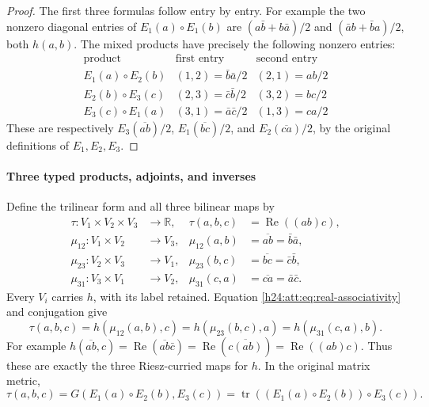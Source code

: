\begin{proof}
The first three formulas follow entry by entry. For example the two
nonzero diagonal entries of $E_1(a)\circ E_1(b)$ are
$(a\bar b+b\bar a)/2$ and $(\bar a b+\bar b a)/2$, both $h(a,b)$.
The mixed products have precisely the following nonzero entries:
\[
\begin{array}{c|c|c}
\text{product}&\text{first entry}&\text{second entry}\\\hline
E_1(a)\circ E_2(b)&(1,2)=\bar b\bar a/2&(2,1)=ab/2\\
E_2(b)\circ E_3(c)&(2,3)=\bar c\bar b/2&(3,2)=bc/2\\
E_3(c)\circ E_1(a)&(3,1)=\bar a\bar c/2&(1,3)=ca/2
\end{array}
\]
These are respectively $E_3(\overline{ab})/2$,
$E_1(\overline{bc})/2$, and $E_2(\overline{ca})/2$, by the original
definitions of $E_1,E_2,E_3$.
\end{proof}

\paragraph{Three typed products, adjoints, and inverses}

Define the trilinear form and all three bilinear maps by
\begin{align}
 \tau:V_1\times V_2\times V_3&\longrightarrow\mathbb R,&
 \tau(a,b,c)&=\operatorname{Re}((ab)c),\label{h24:att:eq:tau}\\
 \mu_{12}:V_1\times V_2&\longrightarrow V_3,&
 \mu_{12}(a,b)&=\overline{ab}=\bar b\bar a,\nonumber\\
 \mu_{23}:V_2\times V_3&\longrightarrow V_1,&
 \mu_{23}(b,c)&=\overline{bc}=\bar c\bar b,\nonumber\\
 \mu_{31}:V_3\times V_1&\longrightarrow V_2,&
 \mu_{31}(c,a)&=\overline{ca}=\bar a\bar c.\nonumber
\end{align}
Every $V_i$ carries $h$, with its label retained. Equation
\eqref{h24:att:eq:real-associativity} and conjugation give
\begin{equation}
 \tau(a,b,c)=h(\mu_{12}(a,b),c)
 =h(\mu_{23}(b,c),a)=h(\mu_{31}(c,a),b).
 \label{h24:att:eq:riesz}
\end{equation}
For example $h(\overline{ab},c)=
\operatorname{Re}(\overline{ab}\bar c)=
\operatorname{Re}(\overline{c(ab)})=\operatorname{Re}((ab)c)$.
Thus these are exactly the three Riesz-curried maps for $h$.
In the original matrix metric,
\begin{equation}
 \tau(a,b,c)=G(E_1(a)\circ E_2(b),E_3(c))
 =\operatorname{tr}((E_1(a)\circ E_2(b))\circ E_3(c)).
 \label{h24:att:eq:tau-jordan}
\end{equation}

